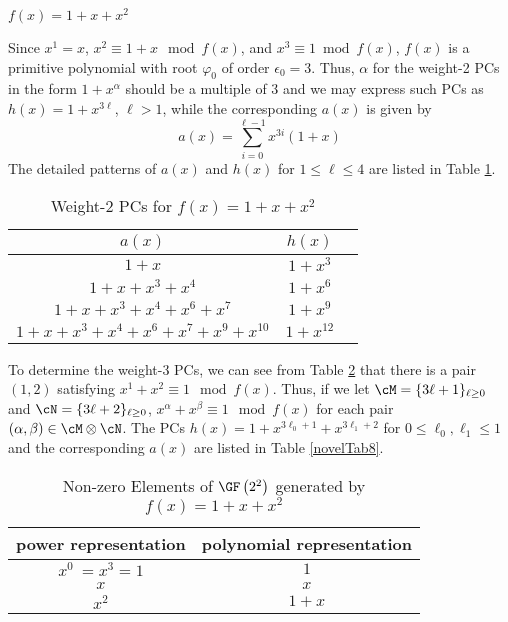 \begin{example}$f(x)=1+x+x^2$

Since $x^1=x$, $x^2 \equiv 1+x \mod f(x)$, and $x^3 \equiv 1 \bmod f(x)$, $f(x)$ is a primitive polynomial with root $\varphi_0$ of order $\epsilon_0=3$. Thus, $\alpha$ for the weight-2 PCs in the form $1+x^\alpha$ should be a multiple of $3$ and we may express such PCs as $h(x)=1+x^{3\ell}$, $\ell>1$, while the corresponding $a(x)$ is given by 
\begin{equation*}
	a(x)=\sum_{i=0}^{\ell-1} x^{3i}(1+x)
\end{equation*}
The detailed patterns of $a(x)$ and $h(x)$ for $1 \leq \ell \leq 4$ are listed in Table \ref{novelTab2}.
\begin{table}[htbp]
 \caption{Weight-2 PCs for $f(x)=1+x+x^2$}
\centering
 \begin{tabular}{c c c} 
 \toprule
 $a(x)$ & $h(x)$ \\ [0.5ex] 
 \midrule
$1+x$
 & $1+x^{3}$ \\
\hline
$1+x+x^3+x^4$
 & $1+x^{6}$ 
 \\
\hline
$1+x+x^3+x^4+x^6+x^{7}$ 
&  $1+x^{9}$ 
\\
\hline
$1+x+x^3+x^4+x^6+x^{7}+x^9+x^{10}$
 &  $1+x^{12}$ \\
 \bottomrule
 \end{tabular}
 \label{novelTab2}
\end{table}

To determine the weight-3 PCs, we can see from Table \ref{novelTab7} that there is a pair $(1,2)$ satisfying $x^1+x^2 \equiv 1 \mod f(x)$. Thus, if we let $\cM = \{3\ell+1\}_{\ell\geq 0}$ and $\cN = \{3\ell+2\}_{\ell\geq 0}$, 
$x^\alpha+x^\beta \equiv 1 \mod f(x)$ for each pair $(\alpha,\beta) \in \cM\otimes\cN$. The PCs $h(x)=1+x^{3\ell_0+1}+x^{3\ell_1+2}$ for $0 \leq \ell_0,\ell_1 \leq 1$ and the corresponding $a(x)$ are listed in Table \ref{novelTab8}.

\begin{table}[htbp]
 \caption{Non-zero Elements of $\GF \left(2^2\right)$ generated by $f(x)=1+x+x^2$}
\centering
 \begin{tabular}{c c} 
 \toprule
 power representation & polynomial representation \\ [0.5ex] 
 \midrule
$x^0~=x^3=1$ & $1$\\
\hline
$x$ & $x$\\
\hline
$x^2$ &  $1+x$\\
\bottomrule
 \end{tabular}
 \label{novelTab7}
\end{table}


\end{example}
